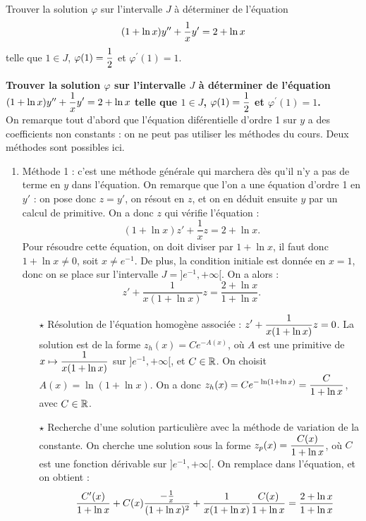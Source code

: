 \documentclass[a4paper, 11pt,reqno]{article}
\begin{document}
\begin{exercice}  \;
Trouver la solution $\varphi$ sur l'intervalle $J$ \`a d\'eterminer de l'\'equation
$$(1+\ln{x})y^{\prime\prime}+\ddp\frac{1}{x}y^{\prime}=2+\ln{x}$$
telle que $1\in J$, $\varphi(1)=\ddp\demi$ et $\varphi^{\prime}(1)=1$.
\end{exercice}
\begin{correction}  \;
\textbf{Trouver la solution $\varphi$ sur l'intervalle $J$ \`a d\'eterminer de l'\'equation $(1+\ln{x})y^{\prime\prime}+\ddp\frac{1}{x}y^{\prime}=2+\ln{x}$ telle que $1\in J$, $\varphi(1)=\ddp\demi$ et $\varphi^{\prime}(1)=1$.}\\
On remarque tout d'abord que l'\'equation dif\'erentielle d'ordre 1 sur $y$ a des coefficients non constants : on ne peut pas utiliser les m\'ethodes du cours. Deux m\'ethodes sont possibles ici.
\begin{enumerate}
\item M\'ethode 1 : c'est une m\'ethode g\'en\'erale qui marchera d\`es qu'il n'y a pas de terme en $y$ dans l'\'equation. On remarque que l'on a une \'equation d'ordre 1 en $y'$ : on pose donc $z=y'$, on r\'esout en $z$, et on en d\'eduit ensuite $y$ par un calcul de primitive. On a donc $z$ qui v\'erifie l'\'equation :
$$(1+\ln x) z' + \frac{1}{x} z = 2+\ln x.$$
Pour r\'esoudre cette \'equation, on doit diviser par $1+\ln x$, il faut donc $1+\ln x\not=0$, soit $x \not=e^{-1}$. De plus, la condition initiale est donn\'ee en $x=1$, donc on se place sur l'intervalle $J=]e^{-1}, +\infty[$. On a alors :
$$z' + \frac{1}{x(1+\ln x)} z = \frac{2+\ln x}{1+\ln x}.$$
\begin{itemize}
\item[$\star$] R\'esolution de l'\'equation homog\`ene associ\'ee : $\ddp z' + \frac{1}{x(1+\ln x)} z = 0$. La solution est de la forme $z_h(x) = C e^{-A(x)}$, o\`u $A$ est une primitive de $x \mapsto \ddp \frac{1}{x(1+\ln x)}$ sur $]e^{-1}, +\infty[$, et $C \in \R$. On choisit $A(x) = \ln (1+\ln x)$. On a donc $z_h(x) = \ddp C e^{-\ln (1+\ln x)} = \frac{C}{1+\ln x}$, avec $C\in \R$.
\item[$\star$] Recherche d'une solution particuli\`ere avec la m\'ethode de variation de la constante. On cherche une solution sous la forme $z_p(x) = \ddp \frac{C(x)}{1+\ln x}$, o\`u $C$ est une fonction d\'erivable sur $]e^{-1}, +\infty[$. On remplace dans l'\'equation, et on obtient :
$$\begin{array}{cl}
& \ddp  \frac{C'(x)}{1+\ln x} + C(x)  \frac{-\frac{1}{x}}{(1+\ln x)^2}+   \frac{1}{x(1+\ln x)} \frac{C(x)}{1+\ln x} =  \frac{2+\ln x}{1+\ln x} \vsec\\

\end{array}$$
\end{itemize}
\end{enumerate}
\end{correction}
\end{document}

